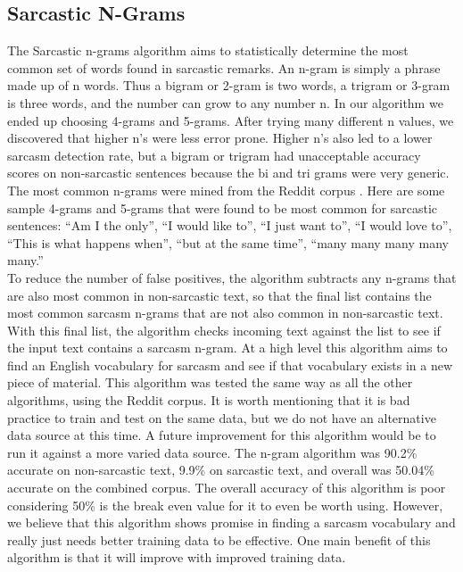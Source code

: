 \documentclass[conference]{IEEEtran}
\begin{document}
\subsection{Sarcastic N-Grams}
The Sarcastic n-grams algorithm aims to statistically determine the most common set of words found in sarcastic remarks. An n-gram is simply a phrase made up of n words. Thus a bigram or 2-gram is two words, a trigram or 3-gram is three words, and the number can grow to any number n. In our algorithm we ended up choosing 4-grams and 5-grams. After trying many different n values, we discovered that higher n’s were less error prone. Higher n’s also led to a lower sarcasm detection rate, but a bigram or trigram had unacceptable accuracy scores on non-sarcastic sentences because the bi and tri grams were very generic. The most common n-grams were mined from the Reddit corpus \cite{b5}. Here are some sample 4-grams and 5-grams that were found to be most common for sarcastic sentences: “Am I the only”, “I would like to”, “I just want to”, “I would love to”, “This is what happens when”, “but at the same time”, “many many many many many.” \\
To reduce the number of false positives, the algorithm subtracts any n-grams that are also most common in non-sarcastic text, so that the final list contains the most common sarcasm n-grams that are not also common in non-sarcastic text. With this final list, the algorithm checks incoming text against the list to see if the input text contains a sarcasm n-gram. At a high level this algorithm aims to find an English vocabulary for sarcasm and see if that vocabulary exists in a new piece of material. This algorithm was tested the same way as all the other algorithms, using the Reddit corpus. It is worth mentioning that it is bad practice to train and test on the same data, but we do not have an alternative data source at this time. A future improvement for this algorithm would be to run it against a more varied data source. The n-gram algorithm was 90.2\% accurate on non-sarcastic text, 9.9\% on sarcastic text, and overall was 50.04\% accurate on the combined corpus. The overall accuracy of this algorithm is poor considering 50\% is the break even value for it to even be worth using. However, we believe that this algorithm shows promise in finding a sarcasm vocabulary and really just needs better training data to be effective. One main benefit of this algorithm is that it will improve with improved training data.\\
\end{document}
